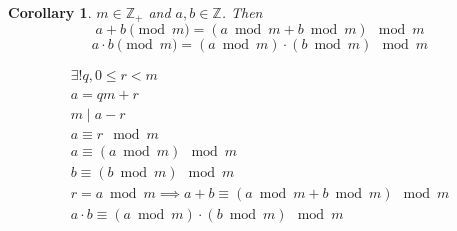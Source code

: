 \documentclass[letterpaper, 12pt]{article}
\newtheorem{corollary}[theorem]{Corollary}
\newenvironment{proof}[1][Proof]{\begin{trivlist}
\item[\hskip \labelsep {\bfseries #1}]}{\end{trivlist}}
\newcommand{\Z}{\mathbb{Z}}
\newcommand{\0}{\emptyset}
\begin{document}
    \begin{corollary}
        $m \in \Z_+$ and $a, b \in \Z$. Then 
        \[a + b \pmod m = (a \bmod m + b \bmod m) \mod m\]
        \[a \cdot b \pmod m = (a \bmod m) \cdot (b \bmod m) \mod m\]
    \end{corollary}
    \begin{proof}
        \begin{gather*}
            \exists! q, 0 \le r < m \\
            a = qm + r \\
            m \mid a - r \\
            a \equiv r \mod m \\
            a \equiv (a \bmod m) \mod m \\
            b \equiv (b \bmod m) \mod m \\
            r = a \bmod m \implies a + b \equiv (a \bmod m + b \bmod m) \mod m \\
            a \cdot b \equiv (a \bmod m) \cdot (b \bmod m) \mod m
        \end{gather*}
    \end{proof}
\end{document}
